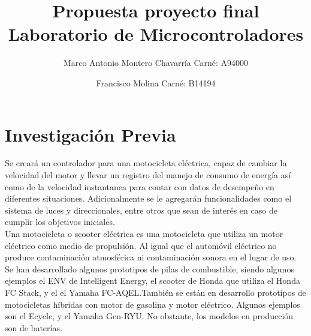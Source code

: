 \documentclass[letterpaper]{article}
\begin{document}
\title{Propuesta proyecto final\\ Laboratorio de Microcontroladores}
\author{
 Marco Antonio Montero Chavarrí­a Carné: A94000\\
  \and
  Francisco Molina Carné: B14194\\  }
\maketitle

\section{Investigación Previa}
Se creará un controlador para una motocicleta eléctrica, capaz de cambiar la velocidad del motor y llevar un registro del manejo de consumo de energía así como de la velocidad instantanea para contar con datos de desempeño en diferentes situaciones. Adicionalmente se le agregarán funcionalidades como el sistema de luces y direccionales, entre otros que sean de interés en caso de cumplir los objetivos iniciales.\\

Una motocicleta o scooter eléctrica es una motocicleta que utiliza un motor eléctrico como medio de propulsión.
Al igual que el automóvil eléctrico no produce contaminación atmosférica ni contaminación sonora en el lugar de uso.
Se han desarrollado algunos prototipos de pilas de combustible, siendo algunos ejemplos el ENV de Intelligent Energy, 
el scooter de Honda que utiliza el Honda FC Stack, y el el Yamaha FC-AQEL.También se están en desarrollo prototipos de 
motocicletas híbridas con motor de gasolina y motor eléctrico. Algunos ejemplos son el Ecycle, y el Yamaha Gen-RYU.
No obstante, los modelos en producción son de baterías. \\
\end{document}
